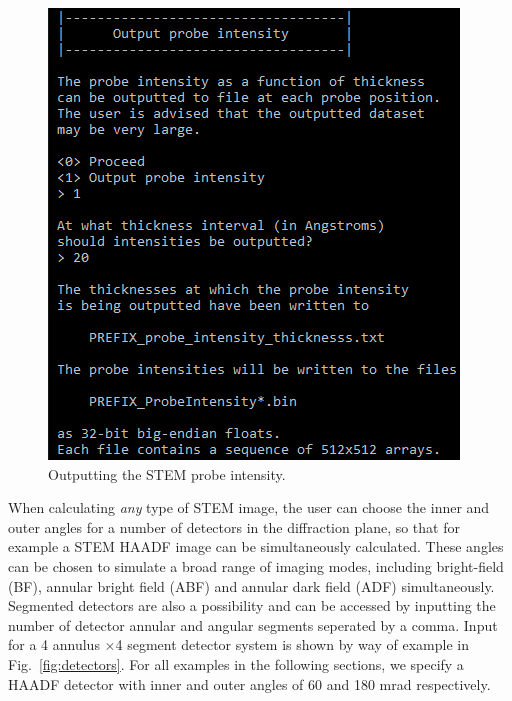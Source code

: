 \documentclass[12pt,a4paper]{article}
\newcommand{\by}{$\times$}
\begin{document}
\begin{figure}[!h]
\begin{center}
    \includegraphics[scale=0.75]{figures/probe_intensity.png}
\caption{Outputting the STEM probe intensity.}
\label{fig:probe_intensity}
\end{center}
\end{figure}

When calculating \emph{any} type of STEM image, the user can choose the inner and outer angles for a number of detectors in the diffraction plane, so that for example a STEM HAADF image can be simultaneously calculated.
These angles can be chosen to simulate a broad range of imaging modes, including bright-field (BF), annular bright field (ABF) and annular dark field (ADF) simultaneously.
Segmented detectors are also a possibility and can be accessed by inputting the number of detector annular and angular segments seperated by a comma.
Input for a 4 annulus \by 4 segment detector system is shown by way of example in Fig.~\ref{fig:detectors}.
For all examples in the following sections, we specify a HAADF detector with inner and outer angles of 60 and 180 mrad respectively.
\end{document}
